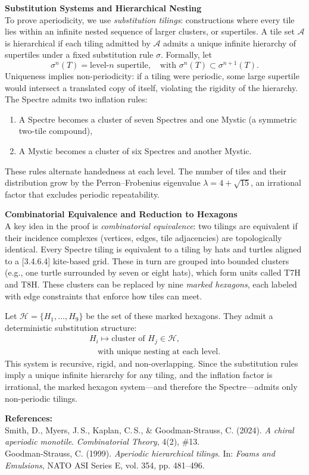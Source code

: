 \begin{technical}
\textbf{Substitution Systems and Hierarchical Nesting}\\[0.5em]
To prove aperiodicity, we use \emph{substitution tilings}: constructions where every tile lies within an infinite nested sequence of larger clusters, or supertiles. A tile set \( \mathcal{A} \) is hierarchical if each tiling admitted by \( \mathcal{A} \) admits a unique infinite hierarchy of supertiles under a fixed substitution rule \( \sigma \). Formally, let
\[
\sigma^n(T) = \text{level-}n \text{ supertile}, \quad \text{with } \sigma^n(T) \subset \sigma^{n+1}(T).
\]
Uniqueness implies non-periodicity: if a tiling were periodic, some large supertile would intersect a translated copy of itself, violating the rigidity of the hierarchy. The Spectre admits two inflation rules:
\begin{enumerate}
    \item A Spectre becomes a cluster of seven Spectres and one Mystic (a symmetric two-tile compound),
    \item A Mystic becomes a cluster of six Spectres and another Mystic.
\end{enumerate}
These rules alternate handedness at each level. The number of tiles and their distribution grow by the Perron–Frobenius eigenvalue \( \lambda = 4 + \sqrt{15} \), an irrational factor that excludes periodic repeatability.

\textbf{Combinatorial Equivalence and Reduction to Hexagons}\\[0.5em]
A key idea in the proof is \emph{combinatorial equivalence}: two tilings are equivalent if their incidence complexes (vertices, edges, tile adjacencies) are topologically identical. Every Spectre tiling is equivalent to a tiling by hats and turtles aligned to a [3.4.6.4] kite-based grid. These in turn are grouped into bounded clusters (e.g., one turtle surrounded by seven or eight hats), which form units called T7H and T8H. These clusters can be replaced by nine \emph{marked hexagons}, each labeled with edge constraints that enforce how tiles can meet.

Let \( \mathcal{H} = \{H_1, \dots, H_9\} \) be the set of these marked hexagons. They admit a deterministic substitution structure:
\begin{align}
H_i \mapsto \text{cluster of } H_j \in \mathcal{H}, \\\quad \text{with unique nesting at each level}.
\end{align}
This system is recursive, rigid, and non-overlapping. Since the substitution rules imply a unique infinite hierarchy for any tiling, and the inflation factor is irrational, the marked hexagon system—and therefore the Spectre—admits only non-periodic tilings.

\vspace{0.5em}
\textbf{References:}\\
Smith, D., Myers, J.\,S., Kaplan, C.\,S., \& Goodman-Strauss, C. (2024). \emph{A chiral aperiodic monotile}. \textit{Combinatorial Theory}, 4(2), \#13.\\
Goodman-Strauss, C. (1999). \emph{Aperiodic hierarchical tilings}. In: \textit{Foams and Emulsions}, NATO ASI Series E, vol. 354, pp. 481–496.
\end{technical}
